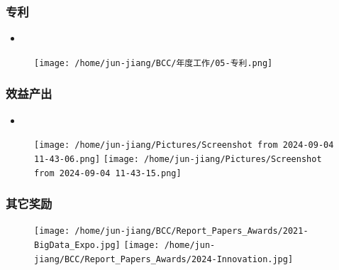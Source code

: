 \frame
{
	\frametitle{专利}
	\begin{itemize}
		\item {\fontsize{7.5pt}{6.2pt}}
	\end{itemize}
\begin{figure}[h!]
\centering
\vskip -5pt
\texttt{[image: /home/jun-jiang/BCC/年度工作/05-专利.png]}
\label{Fig:Patent}
\end{figure}
}

\begin{frame}
	\frametitle{效益产出}
	\begin{itemize}
		\item {\fontsize{7.5pt}{6.2pt}}
	\end{itemize}
\begin{figure}[h!]
\centering
\vskip -5pt
\texttt{[image: /home/jun-jiang/Pictures/Screenshot from 2024-09-04 11-43-06.png]}
\texttt{[image: /home/jun-jiang/Pictures/Screenshot from 2024-09-04 11-43-15.png]}
\label{Fig:Contract}
\end{figure}
{\fontsize{7.5pt}{6.2pt}}
\end{frame}
\begin{frame}
	\frametitle{其它奖励}
\begin{figure}[h!]
\centering
\vskip -5pt
\texttt{[image: /home/jun-jiang/BCC/Report\_Papers\_Awards/2021-BigData\_Expo.jpg]}
\texttt{[image: /home/jun-jiang/BCC/Report\_Papers\_Awards/2024-Innovation.jpg]}
\label{Fig:Award}
\end{figure}
\end{frame}

